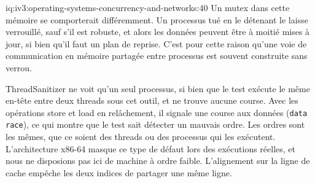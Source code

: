 \begin{solution}{iq:iv3:operating-systems-concurrency-and-networks:40}
Un mutex dans cette mémoire se comporterait différemment. Un processus tué en le détenant le laisse verrouillé, sauf s'il est robuste, et alors les données peuvent être à moitié mises à jour, si bien qu'il faut un plan de reprise. C'est pour cette raison qu'une voie de communication en mémoire partagée entre processus est souvent construite sans verrou.

ThreadSanitizer ne voit qu'un seul processus, si bien que le test exécute le même en-tête entre deux threads sous cet outil, et ne trouve aucune course. Avec les opérations store et load en relâchement, il signale une course aux données (\texttt{data race}), ce qui montre que le test sait détecter un mauvais ordre. Les ordres sont les mêmes, que ce soient des threads ou des processus qui les exécutent. L'architecture x86-64 masque ce type de défaut lors des exécutions réelles, et nous ne disposions pas ici de machine à ordre faible. L'alignement sur la ligne de cache empêche les deux indices de partager une même ligne.

\end{solution}
